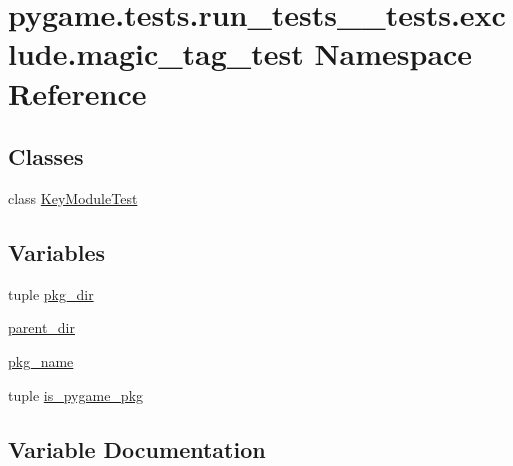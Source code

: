 \hypertarget{namespacepygame_1_1tests_1_1run__tests____tests_1_1exclude_1_1magic__tag__test}{}\section{pygame.\+tests.\+run\+\_\+tests\+\_\+\+\_\+tests.\+exclude.\+magic\+\_\+tag\+\_\+test Namespace Reference}
\label{namespacepygame_1_1tests_1_1run__tests____tests_1_1exclude_1_1magic__tag__test}
\subsection*{Classes}
\begin{DoxyCompactItemize}
\item 
class \hyperlink{classpygame_1_1tests_1_1run__tests____tests_1_1exclude_1_1magic__tag__test_1_1_key_module_test}{Key\+Module\+Test}
\end{DoxyCompactItemize}
\subsection*{Variables}
\begin{DoxyCompactItemize}
\item 
tuple \hyperlink{namespacepygame_1_1tests_1_1run__tests____tests_1_1exclude_1_1magic__tag__test_aca2d9c16ea212f60b99a835283e176ae}{pkg\+\_\+dir}
\item 
\hyperlink{namespacepygame_1_1tests_1_1run__tests____tests_1_1exclude_1_1magic__tag__test_a606049d3787978cb22fb532f9a7be472}{parent\+\_\+dir}
\item 
\hyperlink{namespacepygame_1_1tests_1_1run__tests____tests_1_1exclude_1_1magic__tag__test_a59b3e0907145f7ebd80d88f1eb8412aa}{pkg\+\_\+name}
\item 
tuple \hyperlink{namespacepygame_1_1tests_1_1run__tests____tests_1_1exclude_1_1magic__tag__test_ae163caae7fd8ef79d8417c57aeb0c732}{is\+\_\+pygame\+\_\+pkg}
\end{DoxyCompactItemize}


\subsection{Variable Documentation}
\mbox{\label{namespacepygame_1_1tests_1_1run__tests____tests_1_1exclude_1_1magic__tag__test_ae163caae7fd8ef79d8417c57aeb0c732}} 
